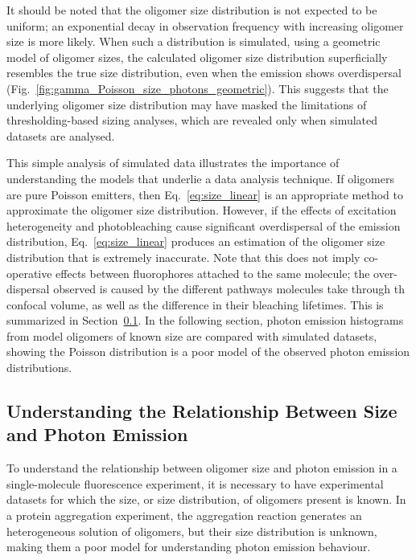 It should be noted that the oligomer size distribution is not expected to be uniform; an exponential decay in observation frequency with increasing oligomer size is more likely. When such a distribution is simulated, using a geometric model of oligomer sizes, the calculated oligomer size distribution superficially resembles the true size distribution, even when the emission shows overdispersal (Fig.~\ref{fig:gamma_Poisson_size_photons_geometric}). This suggests that the underlying oligomer size distribution may have masked the limitations of thresholding-based sizing analyses, which are revealed only when simulated datasets are analysed. 

This simple analysis of simulated data illustrates the importance of understanding the models that underlie a data analysis technique. If oligomers are pure Poisson emitters, then Eq.~\ref{eq:size_linear} is an appropriate method to approximate the oligomer size distribution. However, if the effects of excitation heterogeneity and photobleaching cause significant overdispersal of the emission distribution, Eq.~\ref{eq:size_linear} produces an estimation of the oligomer size distribution that is extremely inaccurate. Note that this does not imply co-operative effects between fluorophores attached to the same molecule; the over-dispersal observed is caused by the different pathways molecules take through th confocal volume, as well as the difference in their bleaching lifetimes. This is summarized in Section~\ref{subsec:understanding_overdispersal}.  In the following section, photon emission histograms from model oligomers of known size are compared with simulated datasets, showing the Poisson distribution is a poor model of the observed photon emission distributions. 

\clearpage  

\subsection{Understanding the Relationship Between Size and Photon Emission}
\label{subsec:understanding_overdispersal}
To understand the relationship between oligomer size and photon emission in a single-molecule fluorescence experiment, it is necessary to have experimental datasets for which the size, or size distribution, of oligomers present is known. In a protein aggregation experiment, the aggregation reaction generates an heterogeneous solution of oligomers, but their size distribution is unknown, making them a poor model for understanding photon emission behaviour. 

